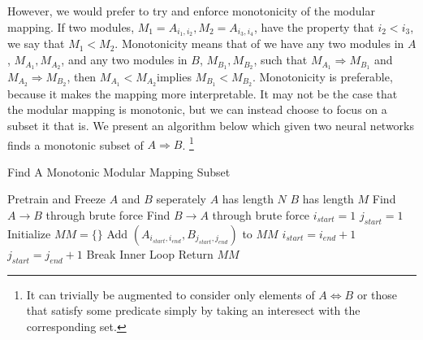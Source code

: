 \documentclass{article} %
\begin{document}
However, we would prefer to try and enforce monotonicity of the modular mapping. If two modules, \(M_1 = A_{i_1, i_2}, M_2 = A_{i_3, i_4}\),
have the property that \(i_2 < i_3\), we say that \(M_1 < M_2\). Monotonicity means that of we have any two modules in \(A\),
\(M_{A_1}, M_{A_2}\), and any two modules in \(B\), \(M_{B_1}, M_{B_2}\), such that \(M_{A_1} \Rightarrow M_{B_1}\)
and \(M_{A_2} \Rightarrow M_{B_2}\), then \(M_{A_1} < M_{A_2}\)implies \(M_{B_1} < M_{B_2}\). Monotonicity is preferable, because
it makes the mapping more interpretable. It may not be the case that the modular mapping is monotonic, but we can instead choose to
focus on a subset it that is. We present an algorithm below which given two neural networks finds a monotonic subset of
\(A \Rightarrow B\).
\footnote{It can trivially be augmented to consider only elements of \(A \Leftrightarrow B\) or those that satisfy some predicate
simply by taking an interesect with the corresponding set.}

\begin{algorithm}
\caption{Find A Monotonic Modular Mapping Subset}
\begin{algorithmic}[h]
      \State Pretrain and Freeze \(A\) and \(B\) seperately
      \State \(A\) has length \(N\)
      \State \(B\) has length \(M\)
      \State Find \(A\rightarrow B\) through brute force
      \State Find \(B\rightarrow A\) through brute force
      \State \(i_{start} = 1\)
      \State \(j_{start} = 1\)
      \State Initialize \(MM = \{\}\)
               \State Add \((A_{i_{start}, i_{end}}, B_{j_{start}, j_{end}})\) to \(MM\)
               \State \(i_{start} = i_{end} + 1\)
               \State \(j_{start} = j_{end} + 1\)
               \State Break Inner Loop
            \EndIf
         \EndFor
      \EndFor
      \State Return \(MM\)
\EndProcedure
\end{algorithmic}
\end{algorithm}
\end{document}
